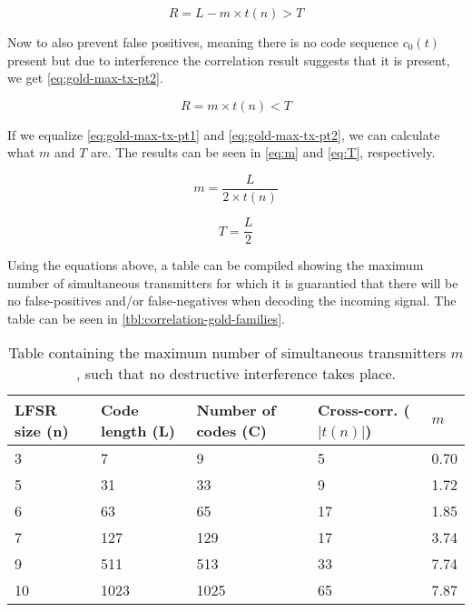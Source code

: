 \begin{equation}
	\label{eq:gold-max-tx-pt1}
	R = L - m \times t(n) > T
\end{equation}

Now to also prevent false positives, meaning there is no code sequence $c_0(t)$ present but due to interference the correlation result suggests that it is present, we get \autoref{eq:gold-max-tx-pt2}.


\begin{equation}
	\label{eq:gold-max-tx-pt2}
	R = m \times t(n) < T
\end{equation}

If we equalize \autoref{eq:gold-max-tx-pt1} and \autoref{eq:gold-max-tx-pt2}, we can calculate what $m$ and $T$ are.
The results can be seen in \autoref{eq:m} and \autoref{eq:T}, respectively.


\begin{equation}
	\label{eq:m}
	m = \frac{L}{2 \times t(n)}
\end{equation}

\begin{equation}
	\label{eq:T}
	T = \frac{L}{2}
\end{equation}


Using the equations above, a table can be compiled showing the maximum number of simultaneous transmitters for which it is guarantied that there will be no false-positives and/or false-negatives when decoding the incoming signal.
The table can be seen in \autoref{tbl:correlation-gold-families}.



\begin{table}[t]
	\centering
	\begin{tabular}{ | l | l | l | l | l |  }

		\hline
		LFSR size (n) 	& Code length (L)	& Number of codes (C)	& Cross-corr. ($|t(n)|$) 	& $m$	\\ \hline

		3				& 7					& 9						& 5							& 0.70	\\ \hline
		5				& 31				& 33					& 9							& 1.72	\\ \hline
		6				& 63				& 65					& 17						& 1.85	\\ \hline
		7				& 127				& 129					& 17						& 3.74	\\ \hline
		9				& 511				& 513					& 33						& 7.74	\\ \hline%
		10				& 1023				& 1025					& 65						& 7.87	\\ \hline	%

	\end{tabular}
	\caption{Table containing the maximum number of simultaneous transmitters $m$, such that no destructive interference takes place.}
	\label{tbl:correlation-gold-families}
\end{table}



